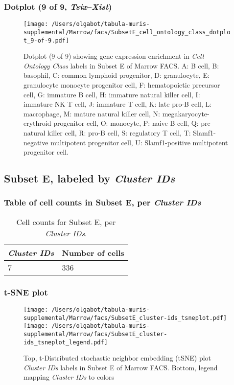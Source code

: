 \subsubsection{Dotplot (9 of 9, \emph{Tsix}--\emph{Xist})}
\begin{figure}[h]
\centering
\texttt{[image: /Users/olgabot/tabula-muris-supplemental/Marrow/facs/SubsetE\_cell\_ontology\_class\_dotplot\_9-of-9.pdf]}

\caption{ Dotplot (9 of 9)  showing gene expression enrichment in \emph{Cell Ontology Class} labels in Subset E of Marrow FACS. A: B cell, B: basophil, C: common lymphoid progenitor, D: granulocyte, E: granulocyte monocyte progenitor cell, F: hematopoietic precursor cell, G: immature B cell, H: immature natural killer cell, I: immature NK T cell, J: immature T cell, K: late pro-B cell, L: macrophage, M: mature natural killer cell, N: megakaryocyte-erythroid progenitor cell, O: monocyte, P: naive B cell, Q: pre-natural killer cell, R: pro-B cell, S: regulatory T cell, T: Slamf1-negative multipotent progenitor cell, U: Slamf1-positive multipotent progenitor cell.}
\end{figure}


\clearpage

\subsection{Subset E, labeled by \emph{Cluster IDs}}
\subsubsection{Table of cell counts in Subset E, per \emph{Cluster IDs}}\begin{table}[h]
\centering
\label{my-label}
\begin{tabular}{@{}ll@{}}
\toprule

\emph{Cluster IDs}& Number of cells \\ \midrule
7 & 336 \\
\bottomrule
\end{tabular}
\caption{Cell counts for Subset E, per \emph{Cluster IDs}.}
\end{table}

\clearpage
\subsubsection{t-SNE plot}
\begin{figure}[h]
\centering
\texttt{[image: /Users/olgabot/tabula-muris-supplemental/Marrow/facs/SubsetE\_cluster-ids\_tsneplot.pdf]}
\texttt{[image: /Users/olgabot/tabula-muris-supplemental/Marrow/facs/SubsetE\_cluster-ids\_tsneplot\_legend.pdf]}
\caption{Top, t-Distributed stochastic neighbor embedding (tSNE) plot  \emph{Cluster IDs} labels in Subset E of Marrow FACS. Bottom, legend mapping \emph{Cluster IDs} to colors}
\end{figure}


